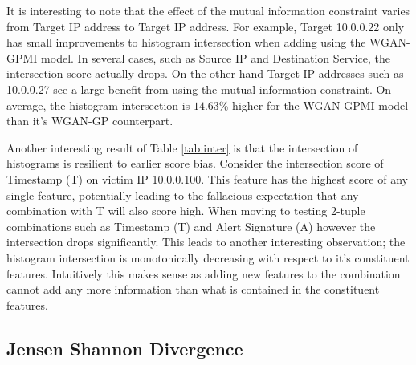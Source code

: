 
It is interesting to note that the effect of the mutual information constraint varies from Target IP address to Target IP address. For example, Target 10.0.0.22 only has small improvements to histogram intersection when adding using the WGAN-GPMI model. In several cases, such as Source IP and Destination Service, the intersection score actually drops. On the other hand Target IP addresses such as 10.0.0.27 see a large benefit from using the mutual information constraint. On average, the histogram intersection is $14.63$\% higher for the WGAN-GPMI model than it's WGAN-GP counterpart. 

Another interesting result of Table \ref{tab:inter} is that the intersection of histograms is resilient to earlier score bias. Consider the intersection score of Timestamp (T) on victim IP 10.0.0.100. This feature has the highest score of any single feature, potentially leading to the fallacious expectation that any combination with T will also score high. When moving to testing 2-tuple combinations such as Timestamp (T) and Alert Signature (A) however the intersection drops significantly. This leads to another interesting observation; the histogram intersection is monotonically decreasing with respect to it's constituent features. Intuitively this makes sense as adding new features to the combination cannot add any more information than what is contained in the constituent features. 

\subsection{Jensen Shannon Divergence}

